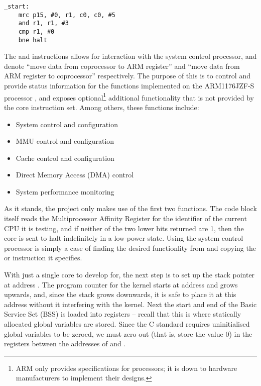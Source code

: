         \lstset{style=asm}
        \begin{lstlisting}[caption={Code to halt three of the four cores},captionpos=b]
_start:
    mrc p15, #0, r1, c0, c0, #5
    and r1, r1, #3
    cmp r1, #0
    bne halt
        \end{lstlisting}

        The  and  instructions allows for interaction with
        the system control processor, and denote ``move data from coprocessor to
        ARM register'' and ``move data from ARM register to coprocessor''
        respectively. The purpose of this is to control and provide status
        information for the functions implemented on the ARM1176JZF-S processor
        \cite[pg.~3-2]{TRM}, and exposes optional\footnote{ARM only provides
        specifications for processors; it is down to hardware manufacturers to
        implement their designs.} additional functionality that is not provided
        by the core instruction set. Among others, these functions include:
        \begin{itemize}
            \itemsep0em
            \item System control and configuration
            \item MMU control and configuration
            \item Cache control and configuration
            \item Direct Memory Access (DMA) control
            \item System performance monitoring
        \end{itemize}

        As it stands, the project only makes use of the first two functions. The
        code block itself reads the Multiprocessor Affinity Register
        \cite{MPIDR} for the identifier of the current CPU it is testing, and if
        neither of the two lower bits returned are 1, then the core is sent to
        halt indefinitely in a low-power state. Using the system control
        processor is simply a case of finding the desired functionlity from
        \cite[pg.~3-14]{TRM} and copying the  or 
        instruction it specifies.

        With just a single core to develop for, the next step is to set up the
        stack pointer at address . The program counter for the
        kernel starts at address  and grows upwards, and, since the
        stack grows downwards, it is safe to place it at this address without it
        interfering with the kernel. Next the start and end of the Basic Service
        Set (BSS) is loaded into registers -- recall that this is where
        statically allocated global variables are stored. Since the C standard
        requires uninitialised global variables to be zeroed, we must zero out
        (that is, store the value 0) in the registers between the addresses of
         and .

